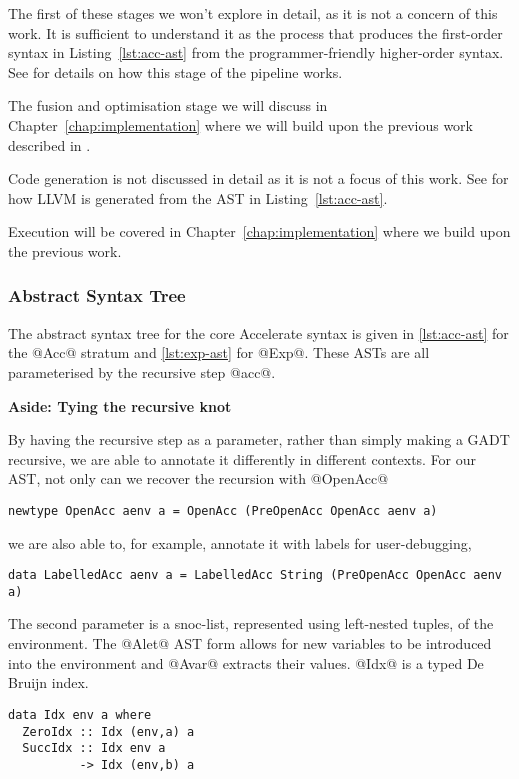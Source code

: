 The first of these stages we won't explore in detail, as it is not a concern of this work. It is sufficient to understand it as the process that produces the first-order syntax in Listing~\ref{lst:acc-ast} from the programmer-friendly higher-order syntax. See \citet{McDonell:acc-optim} for details on how this stage of the pipeline works.

The fusion and optimisation stage we will discuss in Chapter~\ref{chap:implementation} where we will build upon the previous work described in \citet{McDonell:acc-optim}.

Code generation is not discussed in detail as it is not a focus of this work. See \citet{McDonell:2015:acc-llvm} for how LLVM is generated from the AST in Listing~\ref{lst:acc-ast}.

Execution will be covered in Chapter~\ref{chap:implementation} where we build upon the previous work\cite{McDonell:acc-optim,McDonell:2015:acc-llvm,Chakravarty:acc-cuda}.

\subsubsection{Abstract Syntax Tree}

The abstract syntax tree for the core Accelerate syntax is given in \ref{lst:acc-ast} for the @Acc@ stratum and \ref{lst:exp-ast} for @Exp@. These ASTs are all parameterised by the recursive step @acc@.

\begin{aside}
\begin{center}
\textbf{Aside: Tying the recursive knot}
\end{center}

By having the recursive step as a parameter, rather than simply making a GADT recursive, we are able to annotate it differently in different contexts. For our AST, not only can we recover the recursion with @OpenAcc@
%
\begin{lstlisting}
newtype OpenAcc aenv a = OpenAcc (PreOpenAcc OpenAcc aenv a)
\end{lstlisting}
%
we are also able to, for example, annotate it with labels for user-debugging,
%
\begin{lstlisting}
data LabelledAcc aenv a = LabelledAcc String (PreOpenAcc OpenAcc aenv a)
\end{lstlisting}
\end{aside}

The second parameter is a snoc-list, represented using left-nested tuples, of the environment. The @Alet@ AST form allows for new variables to be introduced into the environment and @Avar@ extracts their values. @Idx@ is a typed De Bruijn index.
%
\begin{lstlisting}
data Idx env a where
  ZeroIdx :: Idx (env,a) a
  SuccIdx :: Idx env a
          -> Idx (env,b) a
\end{lstlisting}
%

